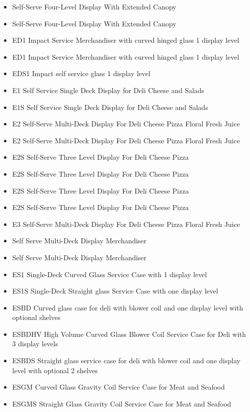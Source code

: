 \begin{itemize}
\item
  Self-Serve Four-Level Display With Extended Canopy
\item
  Self-Serve Four-Level Display With Extended Canopy
\item
  ED1 Impact Service Merchandiser with curved hinged glass 1 display level
\item
  ED1 Impact Service Merchandiser with curved hinged glass 1 display level
\item
  EDS1 Impact self service glass 1 display level
\item
  E1 Self Service Single Deck Display for Deli Cheese and Salads
\item
  E1S Self Service Single Deck Display for Deli Cheese and Salads
\item
  E2 Self-Serve Multi-Deck Display For Deli Cheese Pizza Floral Fresh Juice
\item
  E2 Self-Serve Multi-Deck Display For Deli Cheese Pizza Floral Fresh Juice
\item
  E2S Self-Serve Three Level Display For Deli Cheese Pizza
\item
  E2S Self-Serve Three Level Display For Deli Cheese Pizza
\item
  E2S Self-Serve Three Level Display For Deli Cheese Pizza
\item
  E2S Self-Serve Three Level Display For Deli Cheese Pizza
\item
  E3 Self-Serve Multi-Deck Display For Deli Cheese Pizza Floral Fresh Juice
\item
  Self Serve Multi-Deck Display Merchandiser
\item
  Self Serve Multi-Deck Display Merchandiser
\item
  ES1 Single-Deck Curved Glass Service Case with 1 display level
\item
  ES1S Single-Deck Straight glass Service Case with one display level
\item
  ESBD Curved glass case for deli with blower coil and one display level with optional shelves
\item
  ESBDHV High Volume Curved Glass Blower Coil Service Case for Deli with 3 display levels
\item
  ESBDS Straight glass service case for deli with blower coil and one display level with optional 2 shelves
\item
  ESGM Curved Glass Gravity Coil Service Case for Meat and Seafood
\item
  ESGMS Straight Glass Gravity Coil Service Case for Meat and Seafood

\end{itemize}
